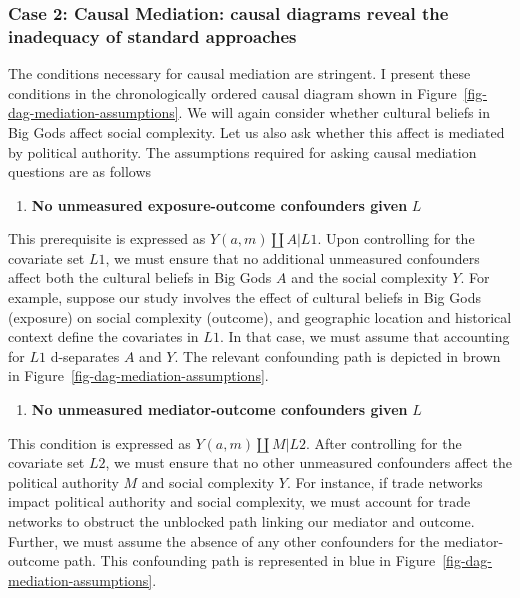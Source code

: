 \documentclass[
  singlecolumn]{article}
\providecommand{\tightlist}{%
  \setlength{\itemsep}{0pt}\setlength{\parskip}{0pt}}\usepackage{longtable,booktabs,array}
\begin{document}
\hypertarget{case-2-causal-mediation-causal-diagrams-reveal-the-inadequacy-of-standard-approaches}{%
\subsubsection{Case 2: Causal Mediation: causal diagrams reveal the
inadequacy of standard
approaches}\label{case-2-causal-mediation-causal-diagrams-reveal-the-inadequacy-of-standard-approaches}}

The conditions necessary for causal mediation are stringent. I present
these conditions in the chronologically ordered causal diagram shown in
Figure~\ref{fig-dag-mediation-assumptions}. We will again consider
whether cultural beliefs in Big Gods affect social complexity. Let us
also ask whether this affect is mediated by political authority. The
assumptions required for asking causal mediation questions are as
follows

\begin{enumerate}
\def\labelenumi{\arabic{enumi}.}
\tightlist
\item
  \textbf{No unmeasured exposure-outcome confounders given} \(L\)
\end{enumerate}

This prerequisite is expressed as \(Y(a,m) \coprod A | L1\). Upon
controlling for the covariate set \(L1\), we must ensure that no
additional unmeasured confounders affect both the cultural beliefs in
Big Gods \(A\) and the social complexity \(Y\). For example, suppose our
study involves the effect of cultural beliefs in Big Gods (exposure) on
social complexity (outcome), and geographic location and historical
context define the covariates in \(L1\). In that case, we must assume
that accounting for \(L1\) d-separates \(A\) and \(Y\). The relevant
confounding path is depicted in brown in
Figure~\ref{fig-dag-mediation-assumptions}.

\begin{enumerate}
\def\labelenumi{\arabic{enumi}.}
\setcounter{enumi}{1}
\tightlist
\item
  \textbf{No unmeasured mediator-outcome confounders given} \(L\)
\end{enumerate}

This condition is expressed as \(Y(a,m) \coprod M | L2\). After
controlling for the covariate set \(L2\), we must ensure that no other
unmeasured confounders affect the political authority \(M\) and social
complexity \(Y\). For instance, if trade networks impact political
authority and social complexity, we must account for trade networks to
obstruct the unblocked path linking our mediator and outcome. Further,
we must assume the absence of any other confounders for the
mediator-outcome path. This confounding path is represented in blue in
Figure~\ref{fig-dag-mediation-assumptions}.
\end{document}
